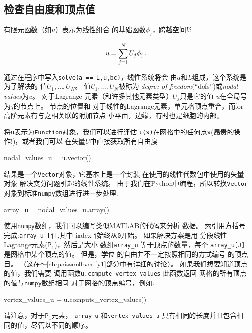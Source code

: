 \subsection{检查自由度和顶点值}
\label{ch:poisson0:impl:dofmap}


有限元函数（如$u$）表示为线性组合
的基础函数$\phi_j$，跨越空间$V$:

\begin{equation}
u = \sum_{j=1}^N U_j \phi_j \label{ch:poisson0:ufem}\tp
\end{equation}

通过在程序中写入\texttt{solve(a == L,u,bc)}，线性系统将会
由$a$和$L$组成，这个系统是为了解决的
值$U_1,\ldots,U_N$。 值$U_1,\ldots,U_N$被称为
\emph{degree of freedom}(``dofs'')或\emph{nodal values}为$u$。 对于Lagrange
元素（和许多其他元素类型）$U_j$只是它的值
$u$在全局号为$j$的节点上。 节点的位置和
对于线性的Lagrange元素，单元格顶点重合，而for
高阶元素有与之相关联的附加节点
小平面，边缘，有时也是细胞的内部。

将\texttt{u}表示为\texttt{Function}对象，我们可以进行评估
\texttt{u(x)}在网格中的任何点\texttt{x}(昂贵的操作!)，或者我们可以
在矢量$U$中直接获取所有自由度

\begin{python}
nodal_values_u = u.vector()
\end{python}
结果是一个\texttt{Vector}对象，它基本上是一个封装
在使用的线性代数包中使用的矢量对象
解决变分问题引起的线性系统。
由于我们在Python中编程，所以转换\texttt{Vector}
对象到标准\texttt{numpy}数组进行进一步处理:


\begin{python}
array_u = nodal_values_u.array()
\end{python}

使用\texttt{numpy}数组，我们可以编写类似MATLAB的代码来分析
数据。 索引用方括号完成:\verb!array_u [j]!,其中
index \texttt{j}始终从\texttt{0}开始。 如果解决方案是用
分段线性Lagrange元素($\mathsf{P}_1$)，然后是大小
数组\verb!array_u! 等于顶点的数量，每个
\verb!array_u[J]! 是网格中某个顶点的值。 但是，学位
的自由并不一定按照相同的方式编号
的顶点
目。 （这在〜\ref{ch:poisson0:verify1}部分中有详细的讨论）。
如果我们想要知道顶点的值，我们需要
调用函数\verb!u.compute_vertex_values! 此函数返回
网格的所有顶点的值与\texttt{numpy}数组相同
对于网格的顶点编号，例如:

\begin{python}
vertex_values_u = u.compute_vertex_values()
\end{python}

请注意，对于$\mathsf{P}_1$元素， \verb!array_u! 和\verb!vertex_values_u! 具有相同的长度并且包含相同的值，尽管以不同的顺序。
